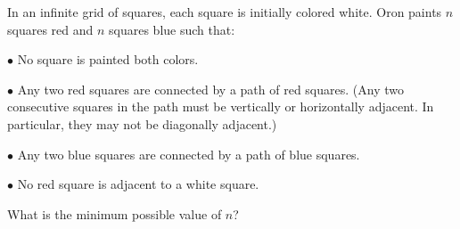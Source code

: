 In an infinite grid of squares, each square is initially colored white. Oron paints $n$ squares red and $n$ squares blue such that:

$\bullet$ No square is painted both colors.

$\bullet$ Any two red squares are connected by a path of red squares. (Any two consecutive squares in the path must be vertically or horizontally adjacent. In particular, they may not be diagonally adjacent.)

$\bullet$ Any two blue squares are connected by a path of blue squares.

$\bullet$ No red square is adjacent to a white square.

What is the minimum possible value of $n$?

